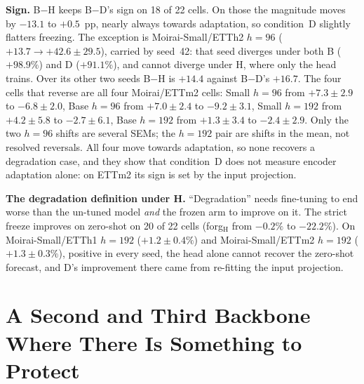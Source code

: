 \textbf{Sign.}  B$-$H keeps B$-$D's sign on 18 of 22 cells.  On those the
magnitude moves by $-13.1$ to $+0.5$~pp, nearly always towards adaptation, so
condition~D slightly flatters freezing.  The exception is Moirai-Small/ETTh2
$h{=}96$ ($+13.7 \to +42.6{\pm}29.5$), carried by seed~42: that seed diverges
under both B ($+98.9\%$) and D ($+91.1\%$), and cannot diverge under H, where only
the head trains.  Over its other two seeds B$-$H is $+14.4$ against B$-$D's
$+16.7$.  The four cells that reverse are all four Moirai/ETTm2 cells: Small
$h{=}96$ from $+7.3{\pm}2.9$ to $-6.8{\pm}2.0$, Base $h{=}96$ from $+7.0{\pm}2.4$
to $-9.2{\pm}3.1$, Small $h{=}192$ from $+4.2{\pm}5.8$ to $-2.7{\pm}6.1$, Base
$h{=}192$ from $+1.3{\pm}3.4$ to $-2.4{\pm}2.9$.  Only the two $h{=}96$ shifts are
several SEMs; the $h{=}192$ pair are shifts in the mean, not resolved reversals.
All four move towards adaptation, so none recovers a degradation case, and they
show that condition~D does not measure encoder adaptation alone: on ETTm2 its sign
is set by the input projection.

\begin{table}[!htbp]
\centering
\caption{The strict freeze (H) beside the frozen encoder (D) on all 22 Moirai
cells, $\denc$ on held-out windows (pp, mean${\pm}$SEM over the seeds H ran).
\textbf{B$-$H reverses B$-$D's sign on the four ETTm2 cells only.}  $n$ varies
by cell; ILI's $452$ is its whole training split.  Generated by
\texttt{scripts/cell\_matrix.py --latex}.}
\label{tab:strictfreeze}

\end{table}

\textbf{The degradation definition under H.}  ``Degradation'' needs fine-tuning
to end worse than the un-tuned model \emph{and} the frozen arm to improve on it.
The strict freeze improves on zero-shot on 20 of 22 cells (forg$_\text{H}$ from
$-0.2\%$ to $-22.2\%$).  On Moirai-Small/ETTh1 $h{=}192$ (${+}1.2{\pm}0.4\%$) and
Moirai-Small/ETTm2 $h{=}192$ (${+}1.3{\pm}0.3\%$), positive in every seed, the
head alone cannot recover the zero-shot forecast, and D's improvement there came
from re-fitting the input projection.

\section{A Second and Third Backbone Where There Is Something to Protect}
\label{app:secondfamily}

